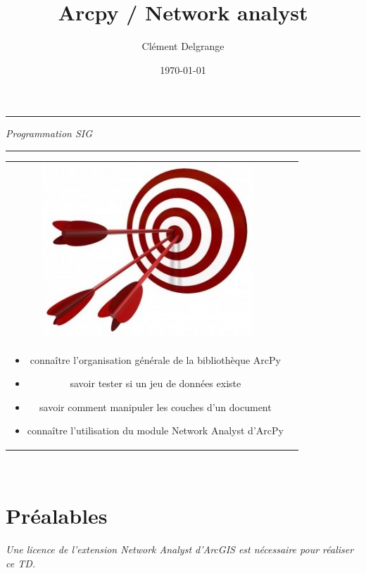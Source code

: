 \documentclass[11pt]{article}
\title{Arcpy / Network analyst}
\author{Clément Delgrange}
\date{\today}
\newenvironment{objectifs}{
	\begin{lrbox}{\mybox}
		\begin{minipage}{0.9\textwidth}
			\vspace{1em}
			\begin{tabular}[t t]{c c}
				\includegraphics[width=0.1\linewidth]{img/goals.jpg} &
				\begin{minipage}[c]{0.8\linewidth}
					\hspace{2em}\textbf{\large{Objectifs :}} \\
}{
				\end{minipage}
			\end{tabular}
			\vspace{1em}
		\end{minipage}
	\end{lrbox}
	\fbox{\usebox{\mybox}}
}
\begin{document}
\parindent=0cm


\begin{titlepage}
\makeatletter
	\begin{sffamily}
		\begin{flushleft}
		\end{flushleft}
		\begin{flushright}
		\end{flushright}

		\vspace{4cm}

		\begin{center}
			\hrule
				\vspace{1em}
				{\small \textit{Programmation SIG}}\\
				\vspace{0.5cm}
				{\huge\bfseries \@title}
				\vspace{1cm}
			\hrule

			\vspace{4cm}
			\begin{objectifs}
				\begin{itemize}
					\item connaître l'organisation générale de la bibliothèque ArcPy
					\item savoir tester si un jeu de données existe
					\item savoir comment manipuler les couches d'un document
					\item connaître l'utilisation du module Network Analyst d'ArcPy
				\end{itemize}
			\end{objectifs}
			\vspace{3cm}
			
			\large \textit{\@author}\\
			\small \textit{\@date}
		\end{center}
	\end{sffamily}
\makeatother
\end{titlepage}




\section*{Préalables}
\textit{Une licence de l'extension Network Analyst d'ArcGIS est nécessaire pour réaliser ce TD.}
\end{document}
